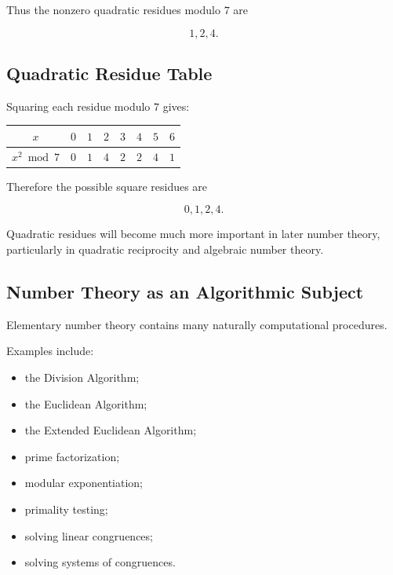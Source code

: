 Thus the nonzero quadratic residues modulo \(7\) are

\[ 1,2,4. \]

\subsection{Quadratic Residue Table}
\label{subsec:quadratic-residue-table}

Squaring each residue modulo \(7\) gives:

\begin{center}
\begin{tabular}{c|ccccccc}
\toprule
\(x\) & \(0\) & \(1\) & \(2\) & \(3\) & \(4\) & \(5\) & \(6\)\\
\midrule
\(x^2\bmod7\) & \(0\) & \(1\) & \(4\) & \(2\) & \(2\) & \(4\) & \(1\)\\
\bottomrule
\end{tabular}
\end{center}

Therefore the possible square residues are

\[ 0,1,2,4. \]

Quadratic residues will become much more important in later number theory,
particularly in quadratic reciprocity and algebraic number theory.

\subsection{Number Theory as an Algorithmic Subject}
\label{subsec:number-theory-algorithms}

Elementary number theory contains many naturally computational procedures.

Examples include:

\begin{itemize}
    \item the Division Algorithm;
    \item the Euclidean Algorithm;
    \item the Extended Euclidean Algorithm;
    \item prime factorization;
    \item modular exponentiation;
    \item primality testing;
    \item solving linear congruences;
    \item solving systems of congruences.
\end{itemize}

